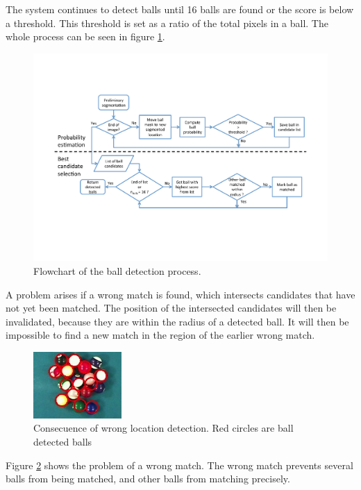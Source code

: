 The system continues to detect balls until 16 balls are found or the score is below a threshold. This threshold is set as a ratio of the total pixels in a ball. The whole process can be seen in figure \ref{fig:ballflowchart}.

\begin{figure}[htpb]
\begin{center}
\includegraphics[width=\textwidth]{images/ballflowchart.pdf}
\caption{Flowchart of the ball detection process.}
\label{fig:ballflowchart}
\end{center}
\end{figure}

A problem arises if a wrong match is found, which intersects candidates that have not yet been matched. The position of the intersected candidates will then be invalidated, because they are within the radius of a detected ball. It will then be impossible to find a new match in the region of the earlier wrong match. 
\begin{figure}[htpb]
\begin{center}
\includegraphics[width=0.3\textwidth]{images/wronglocate.jpg}
\caption{Consecuence of wrong location detection. Red circles are ball detected balls}
\label{fig:wronglocate}
\end{center}
\end{figure}
Figure \ref{fig:wronglocate} shows the problem of a wrong match. The wrong match prevents several balls from being matched, and other balls from matching precisely.

